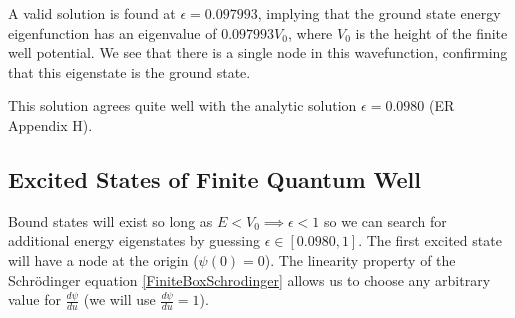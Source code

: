 \documentclass{article}
\begin{document}
\begin{figure}[H]
\centering
{}
\end{figure}
\vspace{-.2in}
\begin{figure}[H]
\centering
{}
\end{figure}
\vspace{-.2in}
\begin{figure}[H]
\centering
{}
\end{figure}
\vspace{-.2in}
\begin{figure}[H]
\centering
{}
\end{figure}
\vspace{-.2in}
\begin{figure}[H]
\centering
{}
\end{figure}
\vspace{-.2in}
\begin{figure}[H]
\centering
{}
\end{figure}

A valid solution is found at $\epsilon = 0.097993$, implying that the 
ground state energy eigenfunction has an eigenvalue of $0.097993V_0$, where
$V_0$ is the height of the finite well potential. We see that there is a single
node in this wavefunction, confirming that this eigenstate is the ground state.

This solution agrees quite well with the analytic solution $\epsilon = 0.0980$
(ER Appendix H).

\subsection{Excited States of Finite Quantum Well}

Bound states will exist so long as $E < V_0 \implies \epsilon < 1$ so we can
search for additional energy eigenstates by guessing $\epsilon \in [0.0980,
1]$. The first excited state will have a node at the origin ($\psi(0) = 0$).
The linearity property of the Schr\"{o}dinger equation
\eqref{FiniteBoxSchrodinger} allows us to choose any arbitrary value for
$\frac{d\psi}{du}$ (we will use $\frac{d\psi}{du}=1$).
\end{document}
